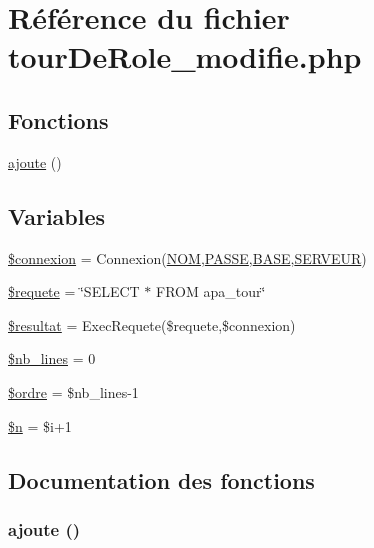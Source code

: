 \hypertarget{tourDeRole__modifie_8php}{
\section{R\'{e}f\'{e}rence du fichier tour\-De\-Role\_\-modifie.php}
\label{tourDeRole__modifie_8php}
}
\subsection*{Fonctions}
\begin{CompactItemize}
\item 
\hyperlink{tourDeRole__modifie_8php_a6}{ajoute} ()
\end{CompactItemize}
\subsection*{Variables}
\begin{CompactItemize}
\item 
\hyperlink{tourDeRole__modifie_8php_a0}{\$connexion} = Connexion(\hyperlink{pma__connect_8php_a0}{NOM},\hyperlink{pma__connect_8php_a1}{PASSE},\hyperlink{pma__connect_8php_a3}{BASE},\hyperlink{pma__connect_8php_a2}{SERVEUR})
\item 
\hyperlink{tourDeRole__modifie_8php_a1}{\$requete} = \char`\"{}SELECT $\ast$ FROM apa\_\-tour\char`\"{}
\item 
\hyperlink{tourDeRole__modifie_8php_a2}{\$resultat} = Exec\-Requete(\$requete,\$connexion)
\item 
\hyperlink{tourDeRole__modifie_8php_a3}{\$nb\_\-lines} = 0
\item 
\hyperlink{tourDeRole__modifie_8php_a4}{\$ordre} = \$nb\_\-lines-1
\item 
\hyperlink{tourDeRole__modifie_8php_a5}{\$n} = \$i+1
\end{CompactItemize}


\subsection{Documentation des fonctions}
\hypertarget{tourDeRole__modifie_8php_a6}{
\subsubsection[ajoute]{\setlength{\rightskip}{0pt plus 5cm}ajoute ()}}
\label{tourDeRole__modifie_8php_a6}




